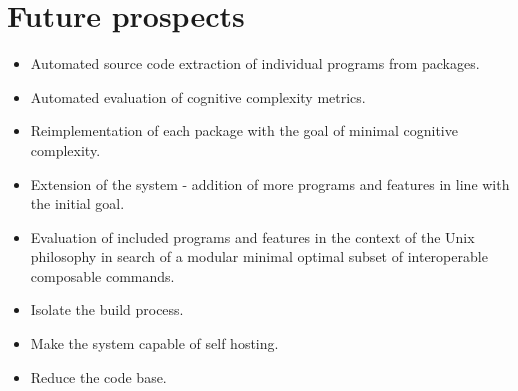\section{Future prospects}\label{Future prospects}

\begin{itemize}
    \item Automated source code extraction of individual programs from packages.
    \item Automated evaluation of cognitive complexity metrics.
    \item Reimplementation of each package with the goal of minimal cognitive complexity.
    \item Extension of the system - addition of more programs and features in line with the initial goal.
    \item Evaluation of included programs and features in the context of the Unix philosophy in search of a modular minimal optimal subset of interoperable composable commands.
    \item Isolate the build process.
    \item Make the system capable of self hosting.
    \item Reduce the code base.
\end{itemize}
